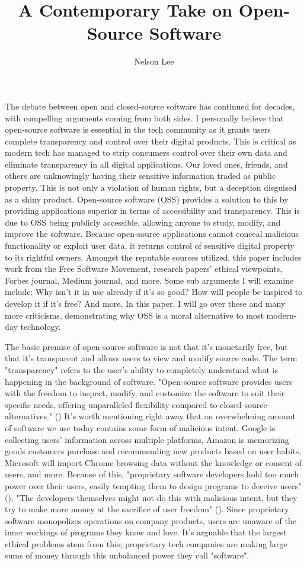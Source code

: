 \documentclass[11pt]{article}
\title{\Large A Contemporary Take on Open-Source Software}
\author{Nelson Lee}
\date{}
\begin{document}
\maketitle

The debate between open and closed-source software has continued for decades, with compelling arguments coming from both sides. I personally believe that open-source software is essential in the tech community as it grants users complete transparency and control over their digital products. This is critical as modern tech has managed to strip consumers control over their own data and eliminate transparency in all digital applications. Our loved ones, friends, and others are unknowingly having their sensitive information traded as public property. This is not only a violation of human rights, but a deception disguised as a shiny product. Open-source software (OSS) provides a solution to this by providing applications superior in terms of accessibility and transparency. This is due to OSS being publicly accessible, allowing anyone to study, modify, and improve the software. Because open-source applications cannot conceal malicious functionality or exploit user data, it returns control of sensitive digital property to its rightful owners. Amongst the reputable sources utilized, this paper includes work from the Free Software Movement, research papers' ethical viewpoints, Forbes journal, Medium journal, and more. Some sub arguments I will examine include: Why isn't it in use already if it's so good? How will people be inspired to develop it if it's free? And more. In this paper, I will go over these and many more criticisms, demonstrating why OSS is a moral alternative to most modern-day technology. 
    
The basic premise of open-source software is not that it's monetarily free, but that it's transparent and allows users to view and modify source code. The term "transparency" refers to the user’s ability to completely understand what is happening in the background of software. "Open-source software provides users with the freedom to inspect, modify, and customize the software to suit their specific needs, offering unparalleled flexibility compared to closed-source alternatives." (\cite{OSSOpenSourceVSClosed2023}) It's worth mentioning right away that an overwhelming amount of software we use today contains some form of malicious intent. Google is collecting users’ information across multiple platforms, Amazon is memorizing goods customers purchase and recommending new products based on user habits, Microsoft will import Chrome browsing data without the knowledge or consent of users, and more. Because of this, "proprietary software developers hold too much power over their users, easily tempting them to design programs to deceive users" (\cite{whySoftwareShouldBeFree}). "The developers themselves might not do this with malicious intent, but they try to make more money at the sacrifice of user freedom" (\cite{whySoftwareShouldBeFree}). Since proprietary software monopolizes operations on company products, users are unaware of the inner workings of programs they know and love. It's arguable that the largest ethical problems stem from this; proprietary tech companies are making large sums of money through this unbalanced power they call "software".
\end{document}
